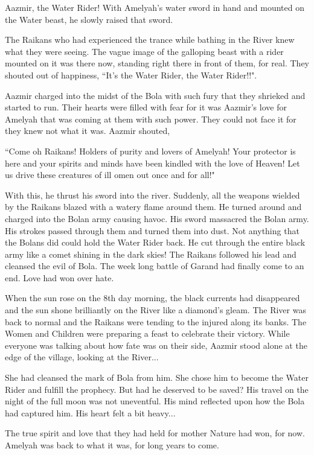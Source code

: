 \documentclass[twoside,11pt,titlepage]{article}
\begin{document}
Aazmir, the Water Rider! With Amelyah's water sword in hand and mounted on the Water beast, he slowly raised that sword.

The Raikans who had experienced the trance while bathing in the River knew what they were seeing. The vague image of the galloping beast with a rider mounted on it was there now, standing right there in front of them, for real. They shouted out of happiness, ``It's the Water Rider, the Water Rider!!".

Aazmir charged into the midst of the Bola with such fury that they shrieked and started to run. Their hearts were filled with fear for it was Aazmir's love for Amelyah that was coming at them with such power. They could not face it for they knew not what it was. Aazmir shouted,

``Come oh Raikans! Holders of purity and lovers of Amelyah! Your protector is here and your spirits and minds have been kindled with the love of Heaven! Let us drive these creatures of ill omen out once and for all!"

With this, he thrust his sword into the river. Suddenly, all the weapons wielded by the Raikans blazed with a watery flame around them. He turned around and charged into the Bolan army causing havoc. His sword massacred the Bolan army. His strokes passed through them and turned them into dust. Not anything that the Bolans did could hold the Water Rider back. He cut through the entire black army like a comet shining in the dark skies! The Raikans followed his lead and cleansed the evil of Bola. The week long battle of Garand had finally come to an end. Love had won over hate.

When the sun rose on the 8th day morning, the black currents had disappeared and the sun shone brilliantly on the River like a diamond's gleam. The River was back to normal and the Raikans were tending to the injured along its banks. The Women and Children were preparing a feast to celebrate their victory. While everyone was talking about how fate was on their side, Aazmir stood alone at the edge of the village, looking at the River...

She had cleansed the mark of Bola from him. She chose him to become the Water Rider and fulfill the prophecy. But had he deserved to be saved? His travel on the night of the full moon was not uneventful. His mind reflected upon how the Bola had captured him. His heart felt a bit heavy...

The true spirit and love that they had held for mother Nature had won, for now. Amelyah was back to what it was, for long years to come.
\end{document}
